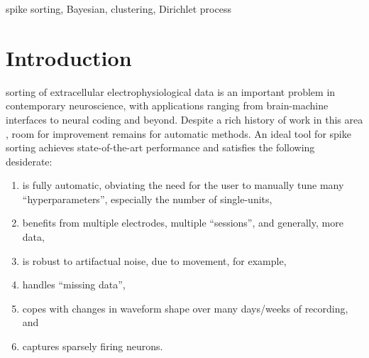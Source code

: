 \documentclass[journal]{IEEEtran}
\begin{document}
\begin{IEEEkeywords}
spike sorting, Bayesian, clustering, Dirichlet process
\end{IEEEkeywords}






%
\IEEEpeerreviewmaketitle



\section{Introduction\label{sec:intro}}
%
%
%
%

 sorting of extracellular electrophysiological data is an important problem in contemporary neuroscience, with applications ranging from brain-machine interfaces \cite{Nicolelis2009} to neural coding \cite{Rieke1997} and beyond.  Despite a rich history of work in this area \cite{Wheeler1991, Einevoll2012}, room for improvement remains for automatic methods.  An ideal tool for spike sorting achieves state-of-the-art performance and satisfies the following desiderate:
\begin{enumerate}
	\item is fully automatic, obviating the need for the user to manually tune many ``hyperparameters'', especially the number of single-units,
	\item benefits from multiple electrodes, multiple ``sessions'', and generally, more data, 
	\item is robust to artifactual noise, due to movement, for example,
	\item handles ``missing data'', 
	\item copes with changes in waveform shape over many days/weeks of recording, and
	\item captures sparsely firing neurons.
\end{enumerate}
\end{document}

